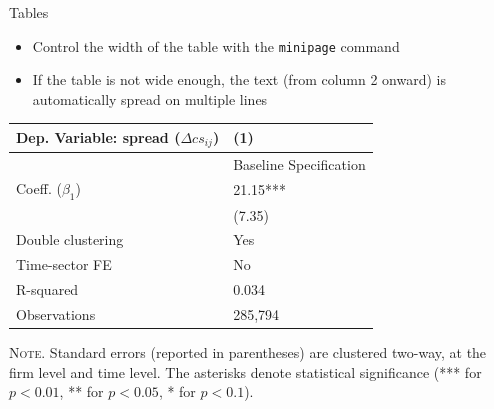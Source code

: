 \documentclass[10pt]{beamer}
\begin{document}
\begin{frame}
	{Tables}
	\begin{itemize}
		\item Control the width of the table with the \texttt{minipage} command \medskip
		\item If the table is not wide enough, the text (from column 2 onward) is automatically spread on multiple lines
	\end{itemize}
	\begin{table}[th]
		\centering%
		\begin{minipage}[b]{.4\textwidth}
			\vspace{.2cm}\tablesize
			\begin{tabularx}{\textwidth}{lY}
				\toprule
				Dep. Variable: spread ($\Delta cs_{ij}$) 	& (1)\\
				\midrule
				& {Baseline Specification} \\
				\midrule
				 Coeff. ($\beta_1$) 		&  21.15*** \\
				&   (7.35) \\
				\midrule
				 Double clustering 		& Yes \\
				Time-sector FE 												& No \\
				 R-squared 					& 0.034 \\
				Observations 												& 285,794 \\\bottomrule
			\end{tabularx}\vspace{.2cm}\newline
			\tiny{{\scshape Note.} Standard errors (reported in parentheses) are clustered two-way, at the firm level and time level. The asterisks denote statistical significance (*** for $p<0.01$, ** for $p<0.05$, * for $p<0.1$).\newline}%
			\label{tab:label}%
		\end{minipage}
	\end{table}
\end{frame}

\end{document}
